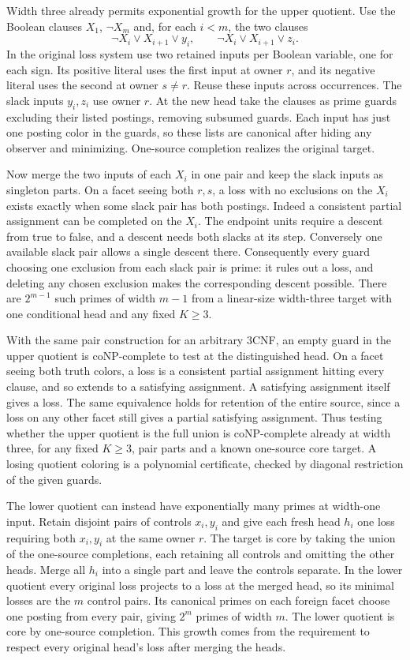 Width three already permits exponential
growth for the upper quotient. Use the
Boolean clauses $X_1$, $\neg X_m$ and,
for each $i<m$, the two clauses
\[
 \neg X_i\lor X_{i+1}\lor y_i,
 \qquad
 \neg X_i\lor X_{i+1}\lor z_i .
\]
In the original loss system use two retained
inputs per Boolean variable, one for each
sign. Its positive literal uses the first
input at owner $r$, and its negative literal
uses the second at owner $s\ne r$. Reuse
these inputs across occurrences. The slack
inputs $y_i,z_i$ use owner $r$. At the new
head take the clauses as prime guards
excluding their listed postings, removing
subsumed guards. Each input has just one
posting color in the guards, so these
lists are canonical after hiding any
observer and minimizing. One-source
completion realizes the original target.

Now merge the two inputs of each
$X_i$ in one pair and keep the slack
inputs as singleton parts. On a facet
seeing both $r,s$, a loss with no
exclusions on the $X_i$ exists exactly
when some slack pair has both postings.
Indeed a consistent partial assignment
can be completed on the $X_i$.
The endpoint units require a descent
from true to false, and a descent
needs both slacks at its step.
Conversely one available slack pair
allows a single descent there.
Consequently every guard choosing
one exclusion from each slack pair
is prime: it rules out a loss, and
deleting any chosen exclusion makes
the corresponding descent possible.
There are $2^{m-1}$ such primes of
width $m-1$ from a linear-size
width-three target with one conditional
head and any fixed $K\geq3$.

With the same pair construction for an
arbitrary 3CNF, an empty guard in the
upper quotient is coNP-complete to test
at the distinguished head. On a facet
seeing both truth colors, a loss is a
consistent partial assignment hitting
every clause, and so extends to a
satisfying assignment. A satisfying
assignment itself gives a loss.
The same equivalence holds for retention
of the entire source, since a loss on
any other facet still gives a partial
satisfying assignment. Thus testing
whether the upper quotient is the full
union is coNP-complete already at width
three, for any fixed $K\geq3$, pair
parts and a known one-source core target.
A losing quotient coloring is a
polynomial certificate, checked by
diagonal restriction of the given guards.

The lower quotient can instead have
exponentially many primes at width-one
input. Retain disjoint pairs of controls
$x_i,y_i$ and give each fresh head $h_i$
one loss requiring both $x_i,y_i$ at the
same owner $r$. The target is core by
taking the union of the one-source
completions, each retaining all controls
and omitting the other heads. Merge all
$h_i$ into a single part and leave the
controls separate. In the lower quotient
every original loss projects to a loss
at the merged head, so its minimal losses
are the $m$ control pairs. Its canonical
primes on each foreign facet choose
one posting from every pair, giving
$2^m$ primes of width $m$. The lower
quotient is core by one-source completion.
This growth comes from the requirement
to respect every original head's loss
after merging the heads.

